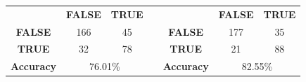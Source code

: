 \begin{frame}
\begin{center}
\begin{table}[]
{\begin{tabular}{ccclccc}
					\multicolumn{1}{|c|}{\cellcolor[HTML]{333333}}                  & \cellcolor[HTML]{C0C0C0}\textbf{FALSE} & \multicolumn{1}{c|}{\cellcolor[HTML]{C0C0C0}\textbf{TRUE}} & \multicolumn{1}{c|}{} & \multicolumn{1}{c|}{\cellcolor[HTML]{333333}}                  & \cellcolor[HTML]{C0C0C0}\textbf{FALSE} & \multicolumn{1}{l|}{\cellcolor[HTML]{C0C0C0}\textbf{TRUE}} \\
					\multicolumn{1}{|c|}{\cellcolor[HTML]{C0C0C0}\textbf{FALSE}}    & \cellcolor[HTML]{32CB00}166              & \multicolumn{1}{c|}{\cellcolor[HTML]{F56B00}45}             & \multicolumn{1}{c|}{} & \multicolumn{1}{c|}{\cellcolor[HTML]{C0C0C0}\textbf{FALSE}}    & \cellcolor[HTML]{32CB00}177              & \multicolumn{1}{c|}{\cellcolor[HTML]{F56B00}35}             \\
					\multicolumn{1}{|c|}{\cellcolor[HTML]{C0C0C0}\textbf{TRUE}}     & \cellcolor[HTML]{F56B00}32              & \multicolumn{1}{c|}{\cellcolor[HTML]{32CB00}78}             & \multicolumn{1}{c|}{} & \multicolumn{1}{c|}{\cellcolor[HTML]{C0C0C0}\textbf{TRUE}}     & \cellcolor[HTML]{F56B00}21              & \multicolumn{1}{c|}{\cellcolor[HTML]{32CB00}88}             \\
					\multicolumn{1}{|c|}{\cellcolor[HTML]{C0C0C0}\textbf{Accuracy}} & \multicolumn{2}{c|}{\cellcolor[HTML]{68CBD0}76.01\%}                                                      & \multicolumn{1}{c|}{} & \multicolumn{1}{c|}{\cellcolor[HTML]{C0C0C0}\textbf{Accuracy}} & \multicolumn{2}{c|}{\cellcolor[HTML]{68CBD0}82.55\%}                                                      \\ \cline{1-3} \cline{5-7} 
				\end{tabular}}
			\end{table}
		\end{center}
	\end{frame}
